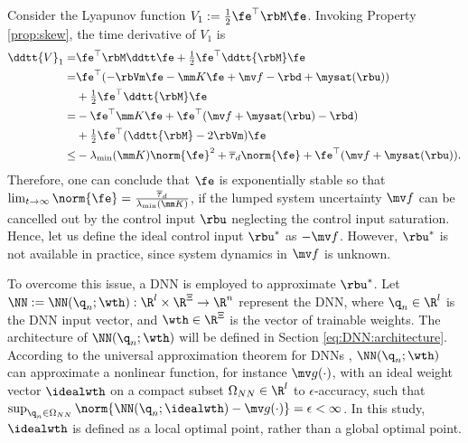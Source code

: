 \documentclass[lettersize,journal]{IEEEtran}
\begin{document}
Consider the Lyapunov function $V_1:= \tfrac{1}{2}\fe^\top \rbM\fe$. 
Invoking Property \ref{prop:skew}, the time derivative of $V_1$ is
\begin{equation}
    \begin{aligned}
        \ddtt{V}_1
        =&
        \fe^\top \rbM \ddtt \fe
        +
        \tfrac{1}{2}\fe^\top \ddtt{\rbM}\fe
        \\
        =&
        \fe^\top (
            -\rbVm \fe -\mm K \fe + \mv f
            -\rbd + \mysat(\rbu)
        )
        \\
        &
        +
        \tfrac{1}{2}
        \fe^\top \ddtt{\rbM}\fe
        \\
        =&
        -
        \fe^\top \mm K \fe 
        +
        \fe^\top (
            \mv f+\mysat(\rbu)
            -\rbd
        )
        \\
        &
        +
        \tfrac{1}{2}
        \fe^\top(\ddtt{\rbM}- 2\rbVm)\fe
        \\
        \le&
        -\lambda_{\min}(\mm K)\norm{\fe}^2
        +
        \overline\tau_d\norm{\fe}
        +
        \fe^\top (\mv f+\mysat(\rbu))
        .
    \end{aligned}
    \label{eq:lya1:dot1}
\end{equation} 
Therefore, one can conclude that $\fe$ is exponentially stable so that $\lim_{t\to\infty}\norm{\fe}=\tfrac{\overline\tau_d}{\lambda_{\min}(\mm K)}$, if the lumped system uncertainty $\mv f$ can be cancelled out by the control input $\rbu$ neglecting the control input saturation.
Hence, let us define the ideal control input $\rbu^*$ as $-\mv f$.
However, $\rbu^*$ is not available in practice, since system dynamics in $\mv f$ is unknown.

To overcome this issue, a DNN is employed to approximate $\rbu^*$.
Let $\NN:=\NN({\q}_n;\wth): \R^{l}\times\R^{\Xi}\to\R^{n}$ represent the DNN, where ${\q}_n\in\R^{l}$ is the DNN input vector, and $\wth\in\R^{\Xi}$ is the vector of trainable weights.
The architecture of $\NN({\q}_n;\wth)$ will be defined in Section \ref{eq:DNN:architecture}.
According to the universal approximation theorem for DNNs \cite{Kidger:2020aa}, $\NN({\q}_n;\wth)$ can approximate a nonlinear function, for instance $\mv g(\cdot)$, with an ideal weight vector $\idealwth$ on a compact subset $\Omega_{NN}\in\R^{l}$ to $\epsilon$-accuracy, such that $\sup_{{\q}_n\in\Omega_{NN}}\norm{ \NN({\q}_n;\idealwth) - \mv g(\cdot)} = \epsilon < \infty$.
In this study, $\idealwth$ is defined as a local optimal point, rather than a global optimal point.
\end{document}
